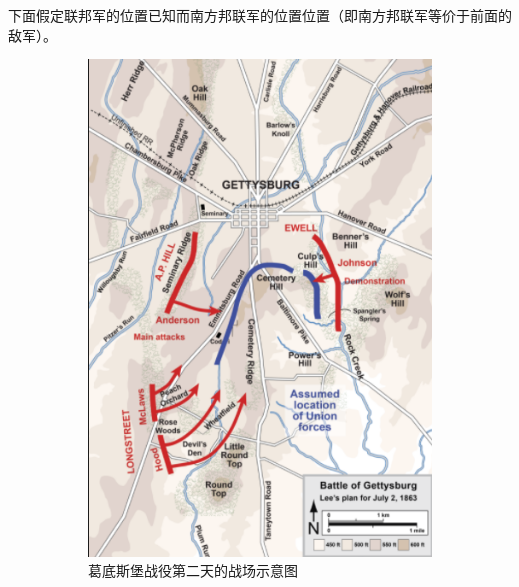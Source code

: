 \documentclass{article}
\begin{document}
下面假定联邦军的位置已知而南方邦联军的位置位置（即南方邦联军等价于前面的敌军）。

\begin{figure}[ht]
  \begin{subfigure}[b]{0.49\linewidth}
    \includegraphics[width=\linewidth]{gettysburg-map.png}
    \caption{葛底斯堡战役第二天的战场示意图}
  \end{subfigure}
  \begin{subfigure}[b]{0.49\linewidth}

\end{subfigure}
\end{figure}
\end{document}
